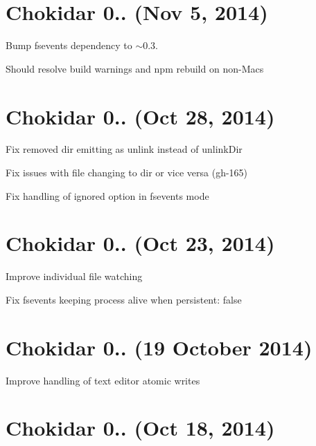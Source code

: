 \section*{Chokidar 0.. (Nov 5, 2014)}


\begin{DoxyItemize}
\item Bump fsevents dependency to $\sim$0.3.
\begin{DoxyItemize}
\item Should resolve build warnings and {\ttfamily npm rebuild} on non-\/\+Macs
\end{DoxyItemize}
\end{DoxyItemize}

\section*{Chokidar 0.. (Oct 28, 2014)}


\begin{DoxyItemize}
\item Fix removed dir emitting as {\ttfamily unlink} instead of {\ttfamily unlink\+Dir}
\item Fix issues with file changing to dir or vice versa (gh-\/165)
\item Fix handling of {\ttfamily ignored} option in fsevents mode
\end{DoxyItemize}

\section*{Chokidar 0.. (Oct 23, 2014)}


\begin{DoxyItemize}
\item Improve individual file watching
\item Fix fsevents keeping process alive when {\ttfamily persistent\+: false}
\end{DoxyItemize}

\section*{Chokidar 0.. (19 October 2014)}


\begin{DoxyItemize}
\item Improve handling of text editor atomic writes
\end{DoxyItemize}

\section*{Chokidar 0.. (Oct 18, 2014)}


